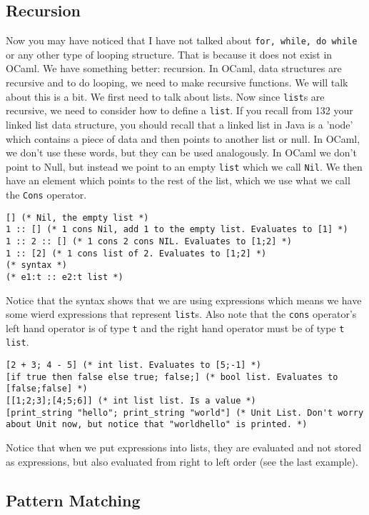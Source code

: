 \documentclass[main.tex]{subfiles}
\begin{document}
\subsection{Recursion}
Now you may have noticed that I have not talked about \texttt{for, while, do while} or any other type of looping structure. That is because it does not exist in OCaml. We have something better: recursion. In OCaml, data structures are recursive and to do looping, we need to make recursive functions. We will talk about this is a bit. We first need to talk about lists. Now since \texttt{list}s are recursive, we need to consider how to define a \texttt{list}. If you recall from 132 your linked list data structure, you should recall that a linked list in Java is a 'node' which contains a piece of data and then points to another list or null. In OCaml, we don't use these words, but they can be used analogously. 
In OCaml we don't point to Null, but instead we point to an empty \texttt{list} which we call \texttt{Nil}. 
We then have an element which points to the rest of the list, which we use what we call the \texttt{Cons} operator. 
\begin{lstlisting}[style=Myocamlstyle]
[] (* Nil, the empty list *)
1 :: [] (* 1 cons Nil, add 1 to the empty list. Evaluates to [1] *)
1 :: 2 :: [] (* 1 cons 2 cons NIL. Evaluates to [1;2] *)
1 :: [2] (* 1 cons list of 2. Evaluates to [1;2] *)
(* syntax *)
(* e1:t :: e2:t list *)
\end{lstlisting}
Notice that the syntax shows that we are using expressions which means we have some wierd expressions that represent \texttt{list}s. Also note that the \texttt{cons} operator's left hand operator is of type \texttt{t} and the right hand operator must be of type \texttt{t list}. 
\begin{lstlisting}[style=Myocamlstyle]
[2 + 3; 4 - 5] (* int list. Evaluates to [5;-1] *)
[if true then false else true; false;] (* bool list. Evaluates to [false;false] *)
[[1;2;3];[4;5;6]] (* int list list. Is a value *)
[print_string "hello"; print_string "world"] (* Unit List. Don't worry about Unit now, but notice that "worldhello" is printed. *)
\end{lstlisting}
Notice that when we put expressions into lists, they are evaluated and not stored as expressions, but also evaluated from right to left order (see the last example). 

\subsection{Pattern Matching}
\end{document}
